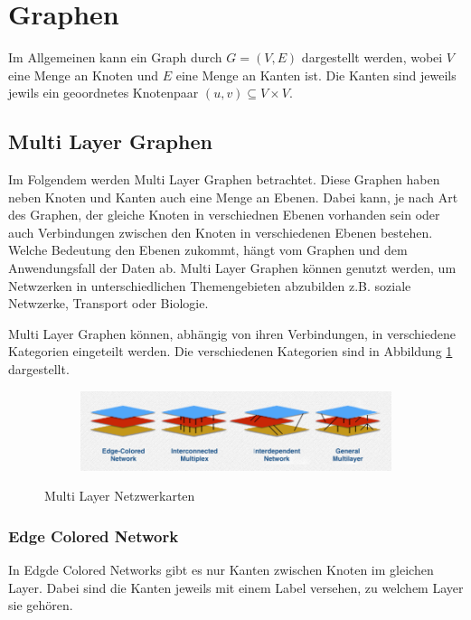 \section{Graphen}


Im Allgemeinen kann ein Graph durch $G = (V, E)$ dargestellt werden, wobei $V$ eine Menge an Knoten und $E$ eine Menge an Kanten ist. Die Kanten sind jeweils jewils ein geoordnetes Knotenpaar $(u, v) \subseteq V \times V$.

\subsection{Multi Layer Graphen}

Im Folgendem werden Multi Layer Graphen betrachtet. Diese Graphen haben neben Knoten und Kanten auch eine Menge an Ebenen. Dabei kann, je nach Art des Graphen, der gleiche Knoten in verschiednen Ebenen vorhanden sein oder auch Verbindungen zwischen den Knoten in verschiedenen Ebenen bestehen.
Welche Bedeutung den Ebenen zukommt, hängt vom Graphen und dem Anwendungsfall der Daten ab. Multi Layer Graphen können genutzt werden, um Netwzerken in unterschiedlichen Themengebieten abzubilden z.B. soziale Netwzerke, Transport oder Biologie.

Multi Layer Graphen können, abhängig von ihren Verbindungen, in verschiedene Kategorien eingeteilt werden. Die verschiedenen Kategorien sind in Abbildung \ref{network_types} dargestellt. 

\begin{figure}
  \centering
  \begin{subfigure}[b]{1.0\textwidth}
    \includegraphics[width=1.0\linewidth]{img/network_types.png}
  \end{subfigure}
  \caption{Multi Layer Netzwerkarten}
  \label{network_types}
\end{figure}

\subsubsection{Edge Colored Network}

In Edgde Colored Networks gibt es nur Kanten zwischen Knoten im gleichen Layer. Dabei sind die Kanten jeweils mit einem Label versehen, zu welchem Layer sie gehören.



